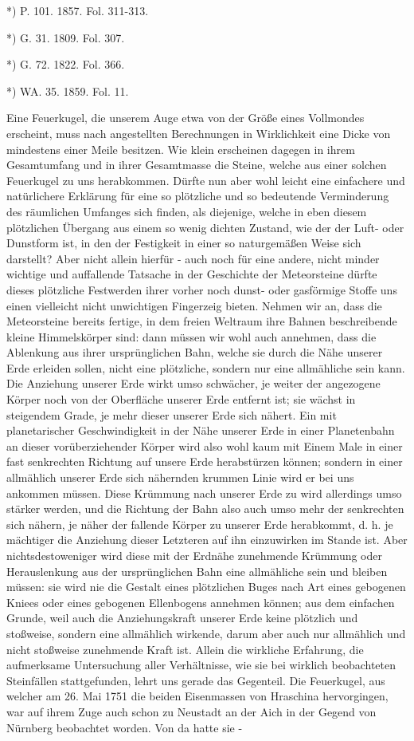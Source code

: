 \documentclass[a4paper, 8pt, oneside, polutonikogreek, german]{article}
\begin{document}
*) P. 101. 1857. Fol. 311-313.

*) G. 31. 1809. Fol. 307.

*) G. 72. 1822. Fol. 366.

*) WA. 35. 1859. Fol. 11.

Eine Feuerkugel, die unserem Auge etwa von der Größe eines Vollmondes erscheint, muss nach angestellten Berechnungen in Wirklichkeit eine Dicke von mindestens einer Meile besitzen. Wie klein erscheinen dagegen in ihrem Gesamtumfang und in ihrer Gesamtmasse die Steine, welche aus einer solchen Feuerkugel zu uns herabkommen. Dürfte nun aber wohl leicht eine einfachere und natürlichere Erklärung für eine so plötzliche und so bedeutende Verminderung des räumlichen Umfanges sich finden, als diejenige, welche in eben diesem plötzlichen Übergang aus einem so wenig dichten Zustand, wie der der Luft- oder Dunstform ist, in den der Festigkeit in einer so naturgemäßen Weise sich darstellt? Aber nicht allein hierfür - auch noch für eine andere, nicht minder wichtige und auffallende Tatsache in der Geschichte der Meteorsteine dürfte dieses plötzliche Festwerden ihrer vorher noch dunst- oder gasförmige Stoffe uns einen vielleicht nicht unwichtigen Fingerzeig bieten. Nehmen wir an, dass die Meteorsteine bereits fertige, in dem freien Weltraum ihre Bahnen beschreibende kleine Himmelskörper sind: dann müssen wir wohl auch annehmen, dass die Ablenkung aus ihrer ursprünglichen Bahn, welche sie durch die Nähe unserer Erde erleiden sollen, nicht eine plötzliche, sondern nur eine allmähliche sein kann. Die Anziehung unserer Erde wirkt umso schwächer, je weiter der angezogene Körper noch von der Oberfläche unserer Erde entfernt ist; sie wächst in steigendem Grade, je mehr dieser unserer Erde sich nähert. Ein mit planetarischer Geschwindigkeit in der Nähe unserer Erde in einer Planetenbahn an dieser vorüberziehender Körper wird also wohl kaum mit Einem Male in einer fast senkrechten Richtung auf unsere Erde herabstürzen können; sondern in einer allmählich unserer Erde sich nähernden krummen Linie wird er bei uns ankommen müssen. Diese Krümmung nach unserer Erde zu wird allerdings umso stärker werden, und die Richtung der Bahn also auch umso mehr der senkrechten sich nähern, je näher der fallende Körper zu unserer Erde herabkommt, d. h. je mächtiger die Anziehung dieser Letzteren auf ihn einzuwirken im Stande ist. Aber nichtsdestoweniger wird diese mit der Erdnähe zunehmende Krümmung oder Herauslenkung aus der ursprünglichen Bahn eine allmähliche sein und bleiben müssen: sie wird nie die Gestalt eines plötzlichen Buges nach Art eines gebogenen Kniees oder eines gebogenen Ellenbogens annehmen können; aus dem einfachen Grunde, weil auch die Anziehungskraft unserer Erde keine plötzlich und stoßweise, sondern eine allmählich wirkende, darum aber auch nur allmählich und nicht stoßweise zunehmende Kraft ist. Allein die wirkliche Erfahrung, die aufmerksame Untersuchung aller Verhältnisse, wie sie bei wirklich beobachteten Steinfällen stattgefunden, lehrt uns gerade das Gegenteil. Die Feuerkugel, aus welcher am 26. Mai 1751 die beiden Eisenmassen von Hraschina hervorgingen, war auf ihrem Zuge auch schon zu Neustadt an der Aich in der Gegend von Nürnberg beobachtet worden. Von da hatte sie - 
\end{document}
